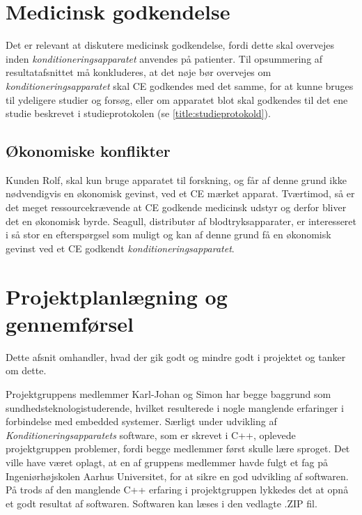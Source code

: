 \section{Medicinsk godkendelse}
Det er relevant at diskutere medicinsk godkendelse, fordi dette skal overvejes inden \textit{konditioneringsapparatet} anvendes på patienter. 
Til opsummering af resultatafsnittet \cite{title:medGodkendelse} må konkluderes, at det nøje bør overvejes om \textit{konditioneringsapparatet} skal CE godkendes med det samme, for at kunne bruges til ydeligere studier og forsøg, eller om apparatet blot skal godkendes til det ene studie beskrevet i studieprotokolen (se \ref{title:studieprotokold}).

\subsection{Økonomiske konflikter}
Kunden Rolf, skal kun bruge apparatet til forskning, og får af denne grund ikke nødvendigvis en økonomisk gevinst, ved et CE mærket apparat. Tværtimod, så er det meget ressourcekrævende at CE godkende medicinsk udstyr og derfor bliver det en økonomisk byrde. Seagull, distributør af blodtryksapparater, er interesseret i så stor en efterspørgsel som muligt og kan af denne grund få en økonomisk gevinst ved et CE godkendt \textit{konditioneringsapparatet}. 

\section{Projektplanlægning og gennemførsel}
Dette afsnit omhandler, hvad der gik godt og mindre godt i projektet og tanker om dette.

Projektgruppens medlemmer Karl-Johan og Simon har begge baggrund som sundhedsteknologistuderende, hvilket resulterede i nogle manglende erfaringer i forbindelse med embedded systemer. Særligt under udvikling af \textit{Konditioneringsapparatets} software, som er skrevet i C++, oplevede projektgruppen problemer, fordi begge medlemmer først skulle lære sproget. Det ville have været oplagt, at en af gruppens medlemmer havde fulgt et fag på Ingeniørhøjskolen Aarhus Universitet, for at sikre en god udvikling af softwaren. På trods af den manglende C++ erfaring i projektgruppen lykkedes det at opnå et godt resultat af softwaren. Softwaren kan læses i den vedlagte .ZIP fil.

